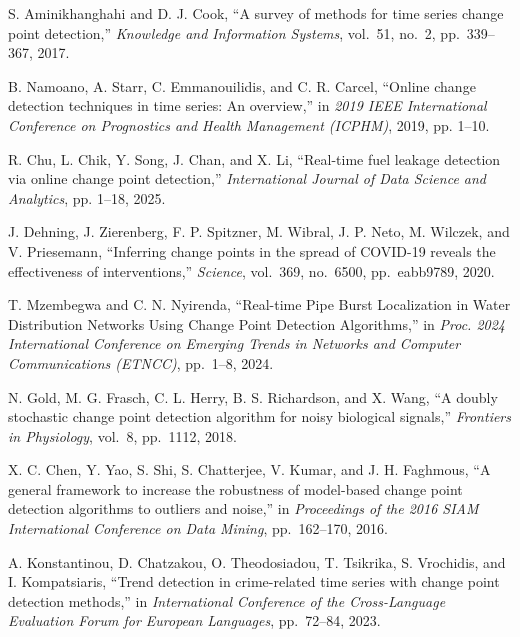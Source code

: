 \documentclass[journal,article,submit,pdftex,moreauthors]{Definitions/mdpi}
\begin{document}

S. Aminikhanghahi and D. J. Cook,
``A survey of methods for time series change point detection,''
\textit{Knowledge and Information Systems}, vol.~51, no.~2, pp.~339--367, 2017.

B. Namoano, A. Starr, C. Emmanouilidis, and C. R. Carcel, ``Online change detection techniques in time series: An overview,'' in \emph{2019 IEEE International Conference on Prognostics and Health Management (ICPHM)}, 2019, pp. 1--10.

R. Chu, L. Chik, Y. Song, J. Chan, and X. Li, ``Real-time fuel leakage detection via online change point detection,'' \emph{International Journal of Data Science and Analytics}, pp. 1--18, 2025.

J. Dehning, J. Zierenberg, F. P. Spitzner, M. Wibral, J. P. Neto, M. Wilczek, and V. Priesemann,
``Inferring change points in the spread of COVID-19 reveals the effectiveness of interventions,''
\textit{Science}, vol.~369, no.~6500, pp.~eabb9789, 2020.

T. Mzembegwa and C. N. Nyirenda,
``Real-time Pipe Burst Localization in Water Distribution Networks Using Change Point Detection Algorithms,''
in \textit{Proc. 2024 International Conference on Emerging Trends in Networks and Computer Communications (ETNCC)}, pp.~1--8, 2024.

N. Gold, M. G. Frasch, C. L. Herry, B. S. Richardson, and X. Wang,
``A doubly stochastic change point detection algorithm for noisy biological signals,''
\textit{Frontiers in Physiology}, vol.~8, pp.~1112, 2018.

X. C. Chen, Y. Yao, S. Shi, S. Chatterjee, V. Kumar, and J. H. Faghmous,
``A general framework to increase the robustness of model-based change point detection algorithms to outliers and noise,''
in \textit{Proceedings of the 2016 SIAM International Conference on Data Mining}, pp.~162--170, 2016.

A. Konstantinou, D. Chatzakou, O. Theodosiadou, T. Tsikrika, S. Vrochidis, and I. Kompatsiaris,
``Trend detection in crime-related time series with change point detection methods,''
in \textit{International Conference of the Cross-Language Evaluation Forum for European Languages}, pp.~72--84, 2023.
\end{document}
